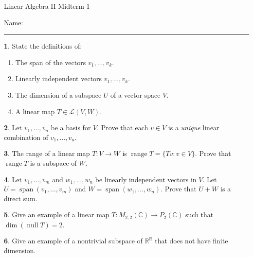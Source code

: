\documentclass[11pt]{article}
\theoremstyle{definition}
\newtheorem{question}{}
\DeclareMathOperator{\dm}{dim}
\DeclareMathOperator{\nll}{null}
\DeclareMathOperator{\spn}{span}
\DeclareMathOperator{\rng}{range}
\begin{document}
\begin{large} Linear Algebra II Midterm 1 \end{large} \hfill Name: \hspace{30ex} \\[-2ex]
\rule{\textwidth}{.1ex}

\begin{question}
State the definitions of:
\begin{enumerate}[leftmargin = *, label={\alph*.}]
\item The span of the vectors $v_1,\dots,v_k$. \vfill 
\item Linearly independent vectors $v_1,\dots,v_k$. \vfill 
\item The dimension of a subspace $U$ of a vector space $V$. \vfill  
\item A linear map $T \in \mathcal{L}(V,W)$. \vfill 
\end{enumerate}
\end{question}

\newpage

\begin{question}
Let $v_1,\dots,v_n$ be a basis for $V$.  Prove that each $v \in V$ is a \emph{unique} 
linear combination of $v_1,\dots,v_n$. 
\end{question}

\newpage

\begin{question}
The range of a linear map $T: V \rightarrow W$ is 
\( \rng T = \{T v : v \in V\}. \)  Prove that $\rng T$ is a subspace of $W$.  
\end{question}

\newpage

\begin{question}
Let $v_1,\dots,v_m$ and $w_1,\dots,w_n$ be linearly independent vectors in $V$.  
Let $U = \spn( v_1,\dots,v_m)$ and $W = \spn( w_1,\dots,w_n )$.  Prove that 
$U + W$ is a direct sum. 
\end{question}

\newpage

\begin{question}
  Give an example of a linear map $T :  M_{2,2}(\mathbb{C}) \rightarrow P_2(\mathbb{C})$
  such that $\dm (\nll T) = 2$. 
\end{question}

\newpage

\begin{question}
Give an example of a nontrivial subspace of $\mathbb{R}^{\mathbb{R}}$ that does not have finite dimension.
\end{question}
\end{document}
